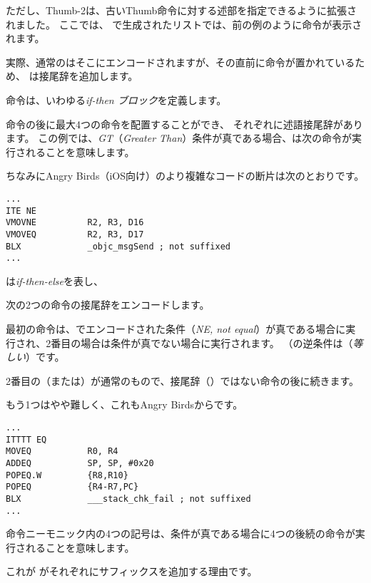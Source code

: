 
ただし、Thumb-2は、古いThumb命令に対する述部を指定できるように拡張されました。
ここでは、 \IDA で生成されたリストでは、前の例のように命令が表示されます。

実際、通常のはそこにエンコードされますが、その直前に命令が置かれているため、
\IDA は接尾辞を追加します。

\label{ARM_Thumb_IT}
命令は、いわゆる\emph{if-then ブロック}を定義します。

命令の後に最大4つの命令を配置することができ、
それぞれに述語接尾辞があります。
この例では、\emph{GT}（\emph{Greater Than}）条件が真である場合、は次の命令が実行されることを意味します。

ちなみにAngry Birds（iOS向け）のより複雑なコードの断片は次のとおりです。

\begin{lstlisting}[caption=Angry Birds Classic,style=customasmARM]
...
ITE NE
VMOVNE          R2, R3, D16
VMOVEQ          R2, R3, D17
BLX             _objc_msgSend ; not suffixed
...
\end{lstlisting}

は\emph{if-then-else}を表し、

次の2つの命令の接尾辞をエンコードします。

最初の命令は、でエンコードされた条件（\emph{NE, not equal}）が真である場合に実行され、2番目の場合は条件が真でない場合に実行されます。
（の逆条件は（\emph{等しい}）です。

2番目の（または）が通常のもので、接尾辞（）ではない命令の後に続きます。

もう1つはやや難しく、これもAngry Birdsからです。

\begin{lstlisting}[caption=Angry Birds Classic,style=customasmARM]
...
ITTTT EQ
MOVEQ           R0, R4
ADDEQ           SP, SP, #0x20
POPEQ.W         {R8,R10}
POPEQ           {R4-R7,PC}
BLX             ___stack_chk_fail ; not suffixed
...
\end{lstlisting}

命令ニーモニック内の4つの記号は、条件が真である場合に4つの後続の命令が実行されることを意味します。

これが \IDA がそれぞれにサフィックスを追加する理由です。

